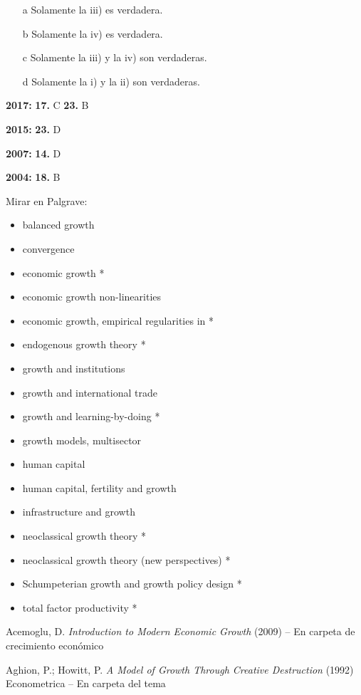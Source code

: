 \documentclass{nuevotema}
\begin{document}
\begin{itemize}
	\item[a] Solamente la iii) es verdadera.
	\item[b] Solamente la iv) es verdadera.
	\item[c] Solamente la iii) y la iv) son verdaderas.
	\item[d] Solamente la i) y la ii) son verdaderas.
\end{itemize}


\notas

\textbf{2017:} \textbf{17.} C \textbf{23.} B

\textbf{2015:} \textbf{23.} D

\textbf{2007:} \textbf{14.} D

\textbf{2004:} \textbf{18.} B

\bibliografia
Mirar en Palgrave:
\begin{itemize}
	\item balanced growth
    \item convergence
    \item economic growth *
    \item economic growth non-linearities
    \item economic growth, empirical regularities in *
    \item endogenous growth theory *
    \item growth and institutions
    \item growth and international trade
    \item growth and learning-by-doing *
    \item growth models, multisector
    \item human capital
    \item human capital, fertility and growth
    \item infrastructure and growth
    \item neoclassical growth theory *
    \item neoclassical growth theory (new perspectives) *
    \item Schumpeterian growth and growth policy design *
    \item total factor productivity *
\end{itemize}

Acemoglu, D. \textit{Introduction to Modern Economic Growth} (2009) -- En carpeta de crecimiento económico

Aghion, P.; Howitt, P. \textit{A Model of Growth Through Creative Destruction} (1992) Econometrica -- En carpeta del tema
\end{document}
